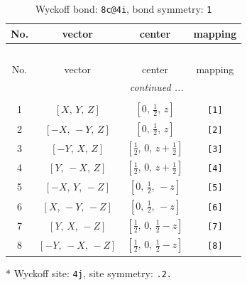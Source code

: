 \documentclass[fleqn,8pt]{jsarticle}
\begin{document}
\renewcommand{\arraystretch}{1.2}
\begin{longtable}{cccc}
\caption{Wyckoff bond: {\tt 8c@4i}, bond symmetry: {\tt 1}}
 \\
 \hline \hline
No. & vector & center & mapping \\ \hline \endfirsthead

\multicolumn{3}{l}{\tablename\ \thetable{}} \\
 \hline \hline
No. & vector & center & mapping \\ \hline \endhead

 \hline \hline
\multicolumn{3}{r}{\footnotesize\it continued ...} \\ \endfoot

 \hline \hline
\multicolumn{3}{r}{} \\ \endlastfoot

1 & $\left[ X,\, Y,\, Z \right]$ & $\left[ 0,\, \frac{1}{2},\, z \right]$ & {\tt [1]} \\ \hline
2 & $\left[ - X,\, - Y,\, Z \right]$ & $\left[ 0,\, \frac{1}{2},\, z \right]$ & {\tt [2]} \\ \hline
3 & $\left[ - Y,\, X,\, Z \right]$ & $\left[ \frac{1}{2},\, 0,\, z + \frac{1}{2} \right]$ & {\tt [3]} \\ \hline
4 & $\left[ Y,\, - X,\, Z \right]$ & $\left[ \frac{1}{2},\, 0,\, z + \frac{1}{2} \right]$ & {\tt [4]} \\ \hline
5 & $\left[ - X,\, Y,\, - Z \right]$ & $\left[ 0,\, \frac{1}{2},\, - z \right]$ & {\tt [5]} \\ \hline
6 & $\left[ X,\, - Y,\, - Z \right]$ & $\left[ 0,\, \frac{1}{2},\, - z \right]$ & {\tt [6]} \\ \hline
7 & $\left[ Y,\, X,\, - Z \right]$ & $\left[ \frac{1}{2},\, 0,\, \frac{1}{2} - z \right]$ & {\tt [7]} \\ \hline
8 & $\left[ - Y,\, - X,\, - Z \right]$ & $\left[ \frac{1}{2},\, 0,\, \frac{1}{2} - z \right]$ & {\tt [8]} \\
\end{longtable}
* Wyckoff site: {\tt 4j}, site symmetry: {\tt .2.}
\renewcommand{\arraystretch}{1.2}
\end{document}
